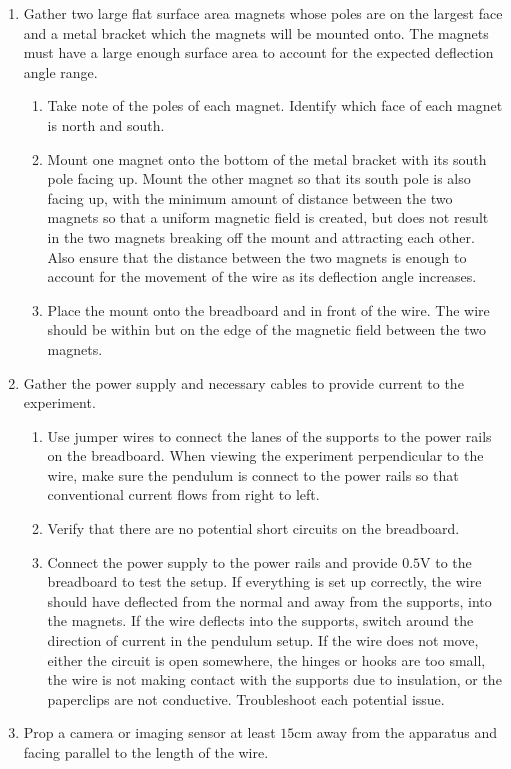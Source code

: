 \begin{enumerate}
	\item Gather two large flat surface area magnets whose poles are on the largest face and a metal bracket which the magnets will be mounted onto.
	The magnets must have a large enough surface area to account for the expected deflection angle range.
	\begin{enumerate}
		\item Take note of the poles of each magnet.
		Identify which face of each magnet is north and south.
		\item Mount one magnet onto the bottom of the metal bracket with its south pole facing up.
		Mount the other magnet so that its south pole is also facing up, with the minimum amount of distance between the two magnets so that a uniform magnetic field is created, but does not result in the two magnets breaking off the mount and attracting each other.
		Also ensure that the distance between the two magnets is enough to account for the movement of the wire as its deflection angle increases.
		\item Place the mount onto the breadboard and in front of the wire.
		The wire should be within but on the edge of the magnetic field between the two magnets.
	\end{enumerate}
	\item Gather the power supply and necessary cables to provide current to the experiment.
	\begin{enumerate}
		\item Use jumper wires to connect the lanes of the supports to the power rails on the breadboard.
		When viewing the experiment perpendicular to the wire, make sure the pendulum is connect to the power rails so that conventional current flows from right to left.
		\item Verify that there are no potential short circuits on the breadboard.
		\item Connect the power supply to the power rails and provide $0.5\si{\volt}$ to the breadboard to test the setup.
		If everything is set up correctly, the wire should have deflected from the normal and away from the supports, into the magnets.
		If the wire deflects into the supports, switch around the direction of current in the pendulum setup.
		If the wire does not move, either the circuit is open somewhere, the hinges or hooks are too small, the wire is not making contact with the supports due to insulation, or the paperclips are not conductive.
		Troubleshoot each potential issue.
	\end{enumerate}
	\item Prop a camera or imaging sensor at least $15\si{\centi\meter}$ away from the apparatus and facing parallel to the length of the wire.

\end{enumerate}

